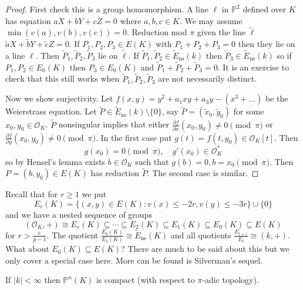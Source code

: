 \documentclass[a4paper]{article}
\theoremstyle{definition}
\theoremstyle{theorem}
\renewcommand*{\P}{\mathbb{P}}
\renewcommand*{\O}{\mathcal{O}}
\begin{document}
\begin{proof}
  First check this is a group homomorphism. A line \(\ell\) in \(\P^2\) defined over \(K\) has equation \(aX + bY + cZ = 0\) where \(a, b, c \in K\). We may assume \(\min (v(a), v(b), v(c)) = 0\). Reduction mod \(\pi\) given the line \(\tilde \ell\) \(\tilde a X + \tilde b Y + \tilde c Z = 0\). If \(P_1, P_2, P_3 \in E(K)\) with \(P_1 + P_2 + P_3 = 0\) then they lie on a line \(\ell\). Then \(\widetilde P_1, \widetilde P_2, \widetilde P_3\) lie on \(\tilde \ell\). If \(\widetilde P_1, \widetilde P_2 \in \widetilde E_{\mathrm{ns}}(k)\) then \(\widetilde P_3 \in \widetilde E_{\mathrm{ns}}(k)\) so if \(P_1, P_2 \in E_0(K)\) then \(P_3 \in E_0(K)\) and \(\widetilde P_1 + \widetilde P_2 + \widetilde P_3 = 0\). It is an exercise to check that this still works when \(\widetilde P_1, \widetilde P_2, \widetilde P_3\) are not necessarily distinct.

  Now we show surjectivity. Let \(f(x, y) = y^2 + a_1xy + a_3y - (x^3 + \dots)\) be the Weierstrass equation. Let \(\widetilde P \in \widetilde E_{\mathrm{ns}}(k) \setminus \{0\}\), say \(\widetilde P = (\tilde x_0, \tilde y_0)\) for some \(x_0, y_0 \in \O_K\). \(\widetilde P\) nonsingular implies that either \(\frac{\partial f}{\partial x}(x_0, y_0) \neq 0 \pmod \pi\) or \(\frac{\partial f}{\partial y}(x_0, y_0) \neq 0 \pmod \pi\). In the first case put \(g(t) = f(t, y_0) \in \O_K[t]\). Then
  \[
    g(x_0) = 0 \pmod \pi, \quad g'(x_0) \in \O_K^*
  \]
  so by Hensel's lemma exists \(b \in \O_K\) such that \(g(b) = 0, b = x_0 \pmod \pi\). Then \(P = (b, y_0) \in E(K)\) has reduction \(\widetilde P\). The second case is similar.
\end{proof}

Recall that for \(r \geq 1\) we put
\[
  E_r(K) = \{(x, y) \in E(K): v(x) \leq -2r, v(y) \leq -3r\} \cup \{0\}
\]
and we have a nested sequence of groups
\[
  (\O_K, +) \cong E_r(K) \subseteq \cdots \subseteq E_2(K) \subseteq E_1(K) \subseteq E_0(K) \subseteq E(K)
\]
for \(r > \frac{e}{p - 1}\). The quotient \(\frac{E_0(K)}{E_1(K)} \cong \widetilde E_{\mathrm{ns}}(K)\) and all quotients \(\frac{E_{t + 1}}{E_t} \cong (k, +)\). What about \(E_0(K) \subseteq E(K)\)? There are much to be said about this but we only cover a special case here. More can be found is Silverman's sequel.

\begin{lemma}
  If \(|k| < \infty\) then \(\P^n(K)\) is compact (with respect to \(\pi\)-adic topology).
\end{lemma}
\end{document}
